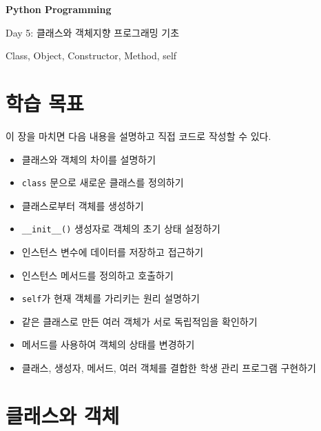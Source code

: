 \documentclass[11pt,a4paper]{article}
\begin{document}
\begin{titlepage}
    \centering
    \vspace*{3cm}

    {\Huge\bfseries Python Programming\par}
    \vspace{0.8cm}
    {\LARGE Day 5: 클래스와 객체지향 프로그래밍 기초\par}

    \vspace{2cm}

    {\large Class, Object, Constructor, Method, self\par}

    \vfill
\end{titlepage}

\tableofcontents
\newpage

\section{학습 목표}

\begin{learningbox}
이 장을 마치면 다음 내용을 설명하고 직접 코드로 작성할 수 있다.
\begin{itemize}[leftmargin=1.5em]
    \item 클래스와 객체의 차이를 설명하기
    \item \texttt{class} 문으로 새로운 클래스를 정의하기
    \item 클래스로부터 객체를 생성하기
    \item \texttt{\_\_init\_\_()} 생성자로 객체의 초기 상태 설정하기
    \item 인스턴스 변수에 데이터를 저장하고 접근하기
    \item 인스턴스 메서드를 정의하고 호출하기
    \item \texttt{self}가 현재 객체를 가리키는 원리 설명하기
    \item 같은 클래스로 만든 여러 객체가 서로 독립적임을 확인하기
    \item 메서드를 사용하여 객체의 상태를 변경하기
    \item 클래스, 생성자, 메서드, 여러 객체를 결합한 학생 관리 프로그램 구현하기
\end{itemize}
\end{learningbox}

\section{클래스와 객체}
\end{document}
